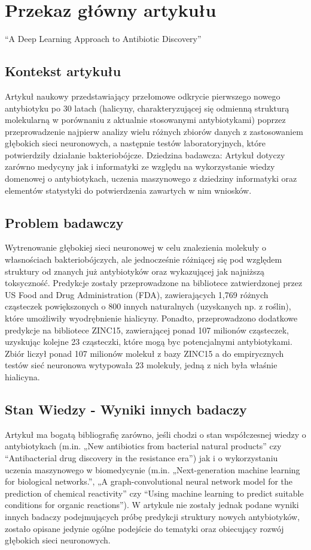 \section{Przekaz główny artykułu}
“A Deep Learning Approach to Antibiotic Discovery”
\subsection{Kontekst artykułu}
Artykuł naukowy przedstawiający przełomowe odkrycie pierwszego nowego antybiotyku po 30 latach (halicyny, charakteryzującej się odmienną strukturą molekularną w porównaniu z aktualnie stosowanymi antybiotykami) poprzez przeprowadzenie najpierw analizy wielu różnych zbiorów danych z zastosowaniem głębokich sieci neuronowych, a następnie testów laboratoryjnych, które potwierdziły działanie bakteriobójcze.
Dziedzina badawcza:
Artykuł dotyczy zarówno medycyny jak i informatyki ze względu na wykorzystanie wiedzy domenowej o antybiotykach, uczenia maszynowego z dziedziny informatyki oraz elementów statystyki do potwierdzenia zawartych w nim wniosków.

\subsection{Problem badawczy}
Wytrenowanie głębokiej sieci neuronowej w celu znalezienia molekuły o własnościach bakteriobójczych, ale jednocześnie różniącej się pod względem struktury od znanych już antybiotyków oraz wykazującej jak najniższą toksyczność. Predykcje zostały przeprowadzone na bibliotece zatwierdzonej przez US Food and Drug Administration (FDA), zawierających 1,769 różnych cząsteczek powiększonych o 800 innych naturalnych (uzyskanych np. z roślin), które umożliwiły wyodrębnienie hialicyny. Ponadto, przeprowadzono dodatkowe predykcje na bibliotece ZINC15, zawierającej ponad 107 milionów cząsteczek, uzyskując kolejne 23 cząsteczki, które mogą byc potencjalnymi antybiotykami. Zbiór liczył ponad 107 milionów molekuł z bazy ZINC15 a do empirycznych testów sieć neuronowa wytypowała 23 molekuły, jedną z nich była właśnie hialicyna.

\subsection{Stan Wiedzy - Wyniki innych badaczy}
Artykuł ma bogatą bibliografię zarówno, jeśli chodzi o stan współczesnej wiedzy o antybiotykach (m.in. „New antibiotics from bacterial natural products” czy “Antibacterial drug discovery in the resistance era”) jak i o wykorzystaniu uczenia maszynowego w biomedycynie (m.in. „Next-generation machine learning for biological networks.”, „A graph-convolutional neural network model for the prediction of chemical reactivity” czy “Using machine learning to predict suitable conditions for organic reactions”). W artykule nie zostały jednak podane wyniki innych badaczy podejmujących próbę predykcji struktury nowych antybiotyków, zostało opisane jedynie ogólne podejście do tematyki oraz obiecujący rozwój głębokich sieci neuronowych.

